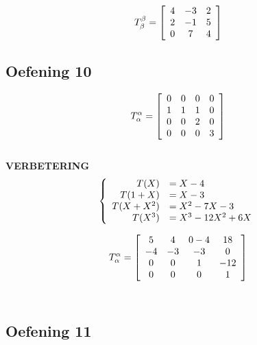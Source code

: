 \documentclass[lineaire_algebra_oplossingen.tex]{subfiles}
\begin{document}
\[
T^{\beta}_{\beta} =
\left[
\begin{array}{c c c}
4 & -3 & 2\\
2 & -1 & 5\\
0 & 7 & 4
\end{array}
\right]
\]


\subsection{Oefening 10}

\[
T^{\alpha}_{\alpha} =
\left[
\begin{array}{c c c c}
0 & 0 & 0 & 0\\
1 & 1 & 1 & 0\\
0 & 0 & 2 & 0\\
0 & 0 & 0 & 3
\end{array}
\right]
\]\\

\textbf{VERBETERING}
\[
\left\lbrace
\begin{array}{r l}
T(X) &= X-4\\
T(1+X) &= X-3\\
T(X+X^2) &= X^2-7X-3\\
T(X^3) &= X^3-12X^2+6X\\
\end{array}
\right.
\]

\[
T^{\alpha}_{\alpha} =
\left[
\begin{array}{c c c c}
5 & 4 & 0-4 & 18\\
-4 & -3 & -3 & 0\\
0 & 0 & 1 & -12\\
0 & 0 & 0 & 1
\end{array}
\right]
\]\\

\subsection{Oefening 11}
\end{document}
